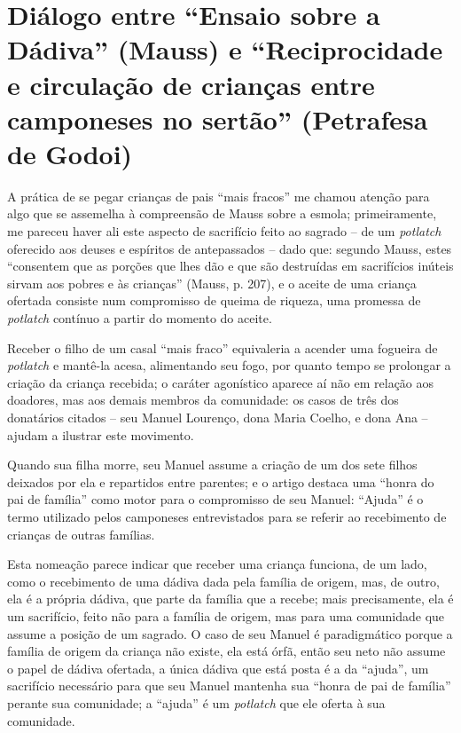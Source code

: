 \section{Diálogo entre \enquote{Ensaio sobre a Dádiva} (Mauss) e \enquote{Reciprocidade e circulação de crianças entre camponeses no sertão} (Petrafesa de Godoi)}

A prática de se pegar crianças de pais \enquote{mais fracos} me chamou atenção para algo que se assemelha à compreensão de Mauss sobre a esmola;
    primeiramente, me pareceu haver ali este aspecto de sacrifício feito ao sagrado -- de um \textit{potlatch} oferecido aos deuses e espíritos de antepassados -- dado que:
        segundo Mauss, estes \enquote{consentem que as porções que lhes dão e que são destruídas em sacrifícios inúteis sirvam aos pobres e às crianças} (Mauss, p. 207), e o aceite de uma criança ofertada consiste num compromisso de queima de riqueza, uma promessa de \textit{potlatch} contínuo a partir do momento do aceite.

Receber o filho de um casal \enquote{mais fraco} equivaleria a acender uma fogueira de \textit{potlatch} e mantê-la acesa, alimentando seu fogo, por quanto tempo se prolongar a criação da criança recebida;
    o caráter agonístico aparece aí não em relação aos doadores, mas aos demais membros da comunidade:
        os casos de três dos donatários citados -- seu Manuel Lourenço, dona Maria Coelho, e dona Ana -- ajudam a ilustrar este movimento.

Quando sua filha morre, seu Manuel assume a criação de um dos sete filhos deixados por ela e repartidos entre parentes;
    e o artigo destaca uma \enquote{honra do pai de família} como motor para o compromisso de seu Manuel:
        \enquote{Ajuda} é o termo utilizado pelos camponeses entrevistados para se referir ao recebimento de crianças de outras famílias.
        
Esta nomeação parece indicar que receber uma criança funciona, de um lado, como o recebimento de uma dádiva dada pela família de origem, mas, de outro, ela é a própria dádiva, que parte da família que a recebe;
mais precisamente, ela é um sacrifício, feito não para a família de origem, mas para uma comunidade que assume a posição de um sagrado.
O caso de seu Manuel é paradigmático porque a família de origem da criança não existe, ela está órfã, então seu neto não assume o papel de dádiva ofertada, a única dádiva que está posta é a da \enquote{ajuda}, um sacrifício necessário para que seu Manuel mantenha sua \enquote{honra de pai de família} perante sua comunidade;
a \enquote{ajuda} é um \textit{potlatch} que ele oferta à sua comunidade.

